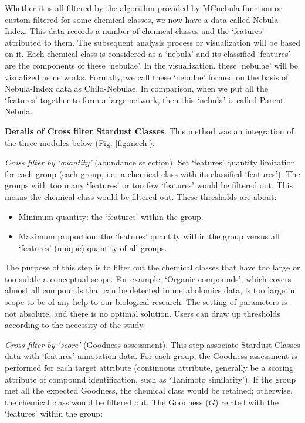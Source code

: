 \documentclass[
]{article}
\providecommand{\tightlist}{%
  \setlength{\itemsep}{0pt}\setlength{\parskip}{0pt}}
\begin{document}
Whether it is all filtered by the algorithm provided by MCnebula
function or custom filtered for some chemical classes, we now have a
data called Nebula-Index. This data records a number of chemical classes
and the `features' attributed to them. The subsequent analysis process
or visualization will be based on it. Each chemical class is considered
as a `nebula' and its classified `features' are the components of these
`nebulae'. In the visualization, these `nebulae' will be visualized as
networks. Formally, we call these `nebulae' formed on the basis of
Nebula-Index data as Child-Nebulae. In comparison, when we put all the
`features' together to form a large network, then this `nebula' is
called Parent-Nebula.

\textbf{Details of Cross filter Stardust Classes}. This method was an
integration of the three modules below (Fig. \ref{fig:mech}):

\emph{Cross filter by `quantity'} (abundance selection). Set `features'
quantity limitation for each group (each group, i.e.~a chemical class
with its classified `features'). The groups with too many `features' or
too few `features' would be filtered out. This means the chemical class
would be filtered out. These thresholds are about:

\begin{itemize}
\tightlist
\item
  Minimum quantity: the `features' within the group.
\item
  Maximum proportion: the `features' quantity within the group versus
  all `features' (unique) quantity of all groups.
\end{itemize}

The purpose of this step is to filter out the chemical classes that have
too large or too subtle a conceptual scope. For example, `Organic
compounds', which covers almost all compounds that can be detected in
metabolomics data, is too large in scope to be of any help to our
biological research. The setting of parameters is not absolute, and
there is no optimal solution. Users can draw up thresholds according to
the necessity of the study.

\emph{Cross filter by `score'} (Goodness assessment). This step
associate Stardust Classes data with `features' annotation data. For
each group, the Goodness assessment is performed for each target
attribute (continuous attribute, generally be a scoring attribute of
compound identification, such as `Tanimoto similarity'). If the group
met all the expected Goodness, the chemical class would be retained;
otherwise, the chemical class would be filtered out. The Goodness
(\(G\)) related with the `features' within the group:
\end{document}
